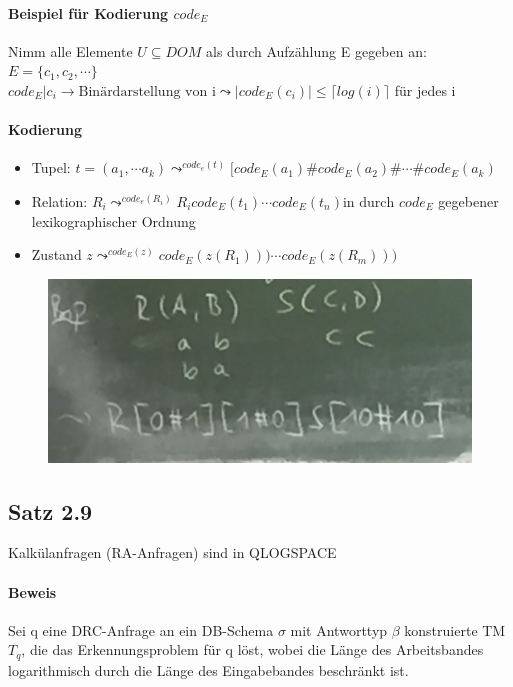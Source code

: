 \documentclass[12pt, a4paper]{article}
\begin{document}
\paragraph{Beispiel für Kodierung $code_E$}
Nimm alle Elemente $U \subseteq DOM$ als durch Aufzählung E gegeben an: $E = \{c_1, c_2, \cdots \} $\\
$code_E | c_i \rightarrow \text{Binärdarstellung von i} \leadsto |code_E(c_i)| \le \lceil log(i) \rceil $ für jedes i

\paragraph{Kodierung}
\begin{itemize}
	\item Tupel: $t = (a_1, \cdots a_k) \leadsto^{code_e(t)} [code_E(a_1)\#code_E(a_2)\#\cdots\# code_E(a_k)$
	\item Relation: $R_i \leadsto^{code_e(R_i)} R_i code_E(t_1) \cdots code_E(t_n) \text{in durch } code_E$ gegebener lexikographischer Ordnung
	\item Zustand $z \leadsto^{code_E(z)} code_E(z(R_1))) \cdots code_E(z(R_m)))$
\end{itemize}

\begin{figure}[h!]
\centering
\includegraphics[width=0.7\linewidth]{img/img24}
\caption{}
\label{fig:img24}
\end{figure}


\subsection*{Satz 2.9}
Kalkülanfragen (RA-Anfragen) sind in QLOGSPACE

\paragraph{Beweis} Sei q eine DRC-Anfrage an ein DB-Schema $\sigma$ mit Antworttyp $\beta$ konstruierte TM $T_q$, die das Erkennungsproblem für q löst, wobei die Länge des Arbeitsbandes logarithmisch durch die Länge des Eingabebandes beschränkt ist.
\end{document}
